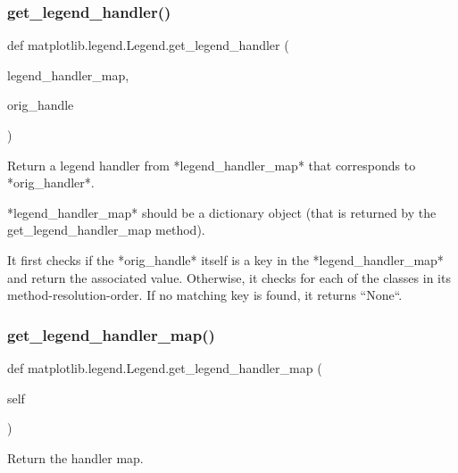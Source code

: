 \subsubsection{\texorpdfstring{get\+\_\+legend\+\_\+handler()}{get\_legend\_handler()}}
{\footnotesize\ttfamily def matplotlib.\+legend.\+Legend.\+get\+\_\+legend\+\_\+handler (\begin{DoxyParamCaption}\item[{}]{legend\+\_\+handler\+\_\+map,  }\item[{}]{orig\+\_\+handle }\end{DoxyParamCaption})\hspace{0.3cm}{\ttfamily [static]}}

\begin{DoxyVerb}Return a legend handler from *legend_handler_map* that
corresponds to *orig_handler*.

*legend_handler_map* should be a dictionary object (that is
returned by the get_legend_handler_map method).

It first checks if the *orig_handle* itself is a key in the
*legend_handler_map* and return the associated value.
Otherwise, it checks for each of the classes in its
method-resolution-order. If no matching key is found, it
returns ``None``.
\end{DoxyVerb}
 \mbox{\label{classmatplotlib_1_1legend_1_1Legend_a4bd2858cc6d47ab656bf1fbf73a6bf15}} 
\subsubsection{\texorpdfstring{get\+\_\+legend\+\_\+handler\+\_\+map()}{get\_legend\_handler\_map()}}
{\footnotesize\ttfamily def matplotlib.\+legend.\+Legend.\+get\+\_\+legend\+\_\+handler\+\_\+map (\begin{DoxyParamCaption}\item[{}]{self }\end{DoxyParamCaption})}

\begin{DoxyVerb}Return the handler map.
\end{DoxyVerb}
 \mbox{\label{classmatplotlib_1_1legend_1_1Legend_a876be30d37bef877f0b27780a2577c37}} 

